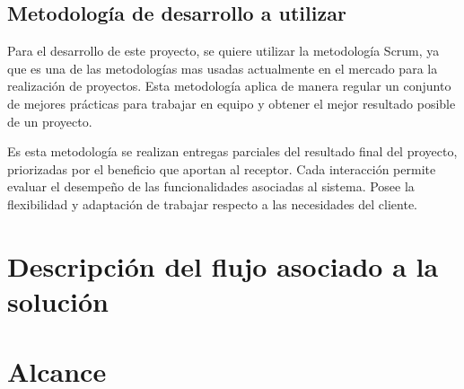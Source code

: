 \subsection{Metodología de desarrollo a utilizar}


\setlength{\parskip}{5mm}
Para el desarrollo de este proyecto, se quiere utilizar la metodología Scrum, ya que es una de las metodologías mas usadas actualmente en el mercado para la realización de proyectos. Esta metodología aplica de manera regular un conjunto de mejores prácticas para trabajar en equipo y obtener el mejor resultado posible de un proyecto.

Es esta metodología se realizan entregas parciales del resultado final del proyecto, priorizadas por el beneficio que aportan al receptor. Cada interacción permite evaluar el desempeño de las funcionalidades asociadas al sistema. Posee la flexibilidad y adaptación de trabajar respecto a las necesidades del cliente. 

\setlength{\parskip}{0mm}

\section{Descripción del flujo asociado a la solución}


\section{Alcance}

